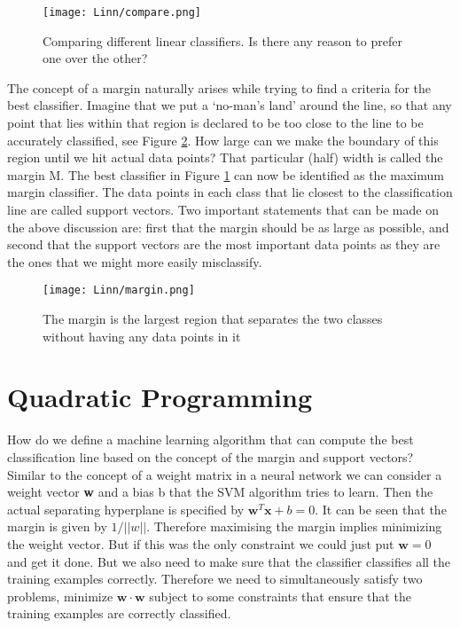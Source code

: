 \documentclass{../template/texnote}
\begin{document}
\begin{figure}
    \centering
    \texttt{[image: Linn/compare.png]}
    \caption{Comparing different linear classifiers. Is there any reason to prefer one over the other?}
    \label{fig:compare}
\end{figure}

The concept of a margin naturally arises while trying to find a criteria for the best classifier. Imagine that we put a ‘no-man’s land’ around the line, so that any point that lies within that region is declared to be too close to the line to be accurately classified, see Figure \ref{fig:margin}.
How large can we make the boundary of this region until we hit actual data points? That particular (half) width is called the margin M. 
The best classifier in Figure \ref{fig:compare} can now be identified as the maximum margin classifier. The data points in each class that lie closest to the  classification line are called support vectors. Two important statements that can be made on the above discussion are: first that the margin should be as large as possible, and second that the support vectors are the most important data points as they are the ones that we might more easily misclassify.


\begin{figure}
    \centering
    \texttt{[image: Linn/margin.png]}
    \caption{The margin is the largest region that separates the two classes without having any data points in it}
    \label{fig:margin}
\end{figure}

\section{Quadratic Programming}
How do we define a machine learning algorithm that can compute the best classification line based on the concept of the margin and support vectors? 
Similar to the concept of a weight matrix in a neural network we can consider a weight vector \textbf{w} and a bias b that the SVM algorithm tries to learn. Then the actual separating hyperplane is specified by $\mathbf{w}^{T}\mathbf{x}+b = 0$. It can be seen that the margin is given by $1/||w||$. Therefore maximising the margin implies minimizing the weight vector. But if this was the only constraint we could just put $\mathbf{w}=0$ and get it done.  But we also need to make sure that the classifier classifies all the training examples correctly. 
Therefore we need to simultaneously satisfy two problems,  minimize $\mathbf{w}\cdot\mathbf{w}$ subject to some constraints that ensure that the training examples are correctly classified.
\end{document}
